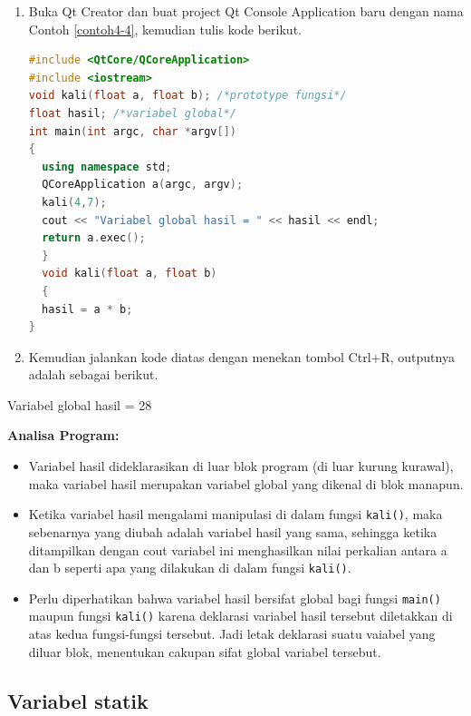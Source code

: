 \begin{enumerate}

\item
  Buka Qt Creator dan buat project Qt Console Application baru dengan
  nama Contoh \ref{contoh4-4}, kemudian tulis kode berikut.

\begin{lstlisting}[language=c++, caption=Variabel Global, label=contoh4-4]
#include <QtCore/QCoreApplication>
#include <iostream>
void kali(float a, float b); /*prototype fungsi*/
float hasil; /*variabel global*/
int main(int argc, char *argv[])
{
  using namespace std;
  QCoreApplication a(argc, argv);
  kali(4,7);
  cout << "Variabel global hasil = " << hasil << endl;
  return a.exec();
  }
  void kali(float a, float b)
  {
  hasil = a * b;
}
\end{lstlisting}
\item
  Kemudian jalankan kode diatas dengan menekan tombol Ctrl+R, outputnya
  adalah sebagai berikut.
\end{enumerate}
\begin{lcverbatim}
Variabel global hasil = 28
\end{lcverbatim}


\textbf{Analisa Program:}

\begin{itemize}

\item
  Variabel hasil dideklarasikan di luar blok program (di luar kurung
  kurawal), maka variabel hasil merupakan variabel global yang dikenal
  di blok manapun.
\item
  Ketika variabel hasil mengalami manipulasi di dalam fungsi
  \texttt{kali()}, maka sebenarnya yang diubah adalah variabel hasil
  yang sama, sehingga ketika ditampilkan dengan cout variabel ini
  menghasilkan nilai perkalian antara a dan b seperti apa yang dilakukan
  di dalam fungsi \texttt{kali()}.
\item
  Perlu diperhatikan bahwa variabel hasil bersifat global bagi fungsi
  \texttt{main()} maupun fungsi \texttt{kali()} karena deklarasi
  variabel hasil tersebut diletakkan di atas kedua fungsi-fungsi
  tersebut. Jadi letak deklarasi suatu vaiabel yang diluar blok,
  menentukan cakupan sifat global variabel tersebut.
\end{itemize}

\subsection{ Variabel statik}\label{variabel-statik}


